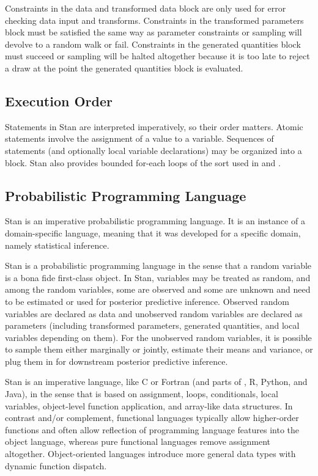 Constraints in the data and transformed data block are only used for
error checking data input and transforms.  Constraints in the
transformed parameters block must be satisfied the same way as
parameter constraints or sampling will devolve to a random walk or
fail.  Constraints in the generated quantities block must succeed or
sampling will be halted altogether because it is too late to reject
a draw at the point the generated quantities block is evaluated.

\subsection{Execution Order}

Statements in Stan are interpreted imperatively, so their order
matters.  Atomic statements involve the assignment of a value to a
variable.  Sequences of statements (and optionally local variable
declarations) may be organized into a block.  Stan also provides bounded
for-each loops of the sort used in \R and \BUGS.



\subsection{Probabilistic Programming Language}

Stan is an imperative probabilistic programming language.  It is an
instance of a domain-specific language, meaning that it was
developed for a specific domain, namely statistical inference.

Stan is a probabilistic programming language in the sense that a
random variable is a bona fide first-class object.  In Stan, variables
may be treated as random, and among the random variables, some are
observed and some are unknown and need to be estimated or used for
posterior predictive inference.  Observed random variables are
declared as data and unobserved random variables are declared as
parameters (including transformed parameters, generated quantities, and
local variables depending on them).  For the unobserved random
variables, it is possible to sample them either marginally or jointly,
estimate their means and variance, or plug them in for downstream
posterior predictive inference.

Stan is an imperative language, like C or Fortran (and parts of \Cpp,
R, Python, and Java), in the sense that is based on assignment, loops,
conditionals, local variables, object-level function application, and
array-like data structures.  In contrast and/or complement, functional
languages typically allow higher-order functions and often allow
reflection of programming language features into the object language,
whereas pure functional languages remove assignment altogether.
Object-oriented languages introduce more general data types with
dynamic function dispatch.

